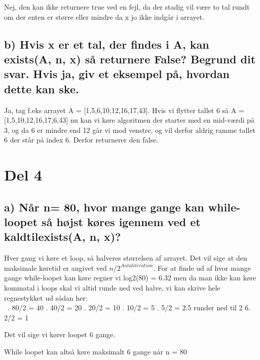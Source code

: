 \documentclass{article}
\begin{document}
Nej, den kan ikke returnere true ved en fejl, da der stadig vil være to tal rundt om der enten er større eller mindre da x jo ikke indgår i arrayet.
\
\subsection*{b) Hvis x er et tal, der findes i A, kan exists(A, n, x) så returnere False? Begrund dit svar. Hvis ja, giv et eksempel på, hvordan dette kan ske.} 

Ja, tag f.eks arrayet A = [1,5,6,10,12,16,17,43]. Hvis vi flytter tallet 6 så A = [1,5,10,12,16,17,6,43] nu kan vi køre algoritmen der starter med en mid-værdi på 3, og da 6 er mindre end 12 går vi mod venstre, og vil derfor aldrig ramme tallet 6 der står på index 6. Derfor returnerer den false.


\section*{Del 4} \subsection*{a) Når n= 80, hvor mange gange kan while-loopet så højst køres igennem ved et kaldtilexists(A, n, x)?} 
Hver gang vi køre et loop, så halveres størrelsen af arrayet. Det vil sige at den maksimale køretid er angivet ved $n/2^{Antal iteration}$. For at finde ud af hvor mange gange while-loopet kan køre regner vi log2(80) = 6.32 men da man ikke kan køre kommatal i loops skal vi altid runde ned ved halve, vi kan skrive hele regnestykket ud sådan her:\\\
\newline
1. 80/2 = 40 . 40/2 = 20 . 20/2 = 10 . 10/2 = 5 . 5/2 = 2.5 \newline
runder ned til 2
6. 2/2 = 1 \newline

Det vil sige vi kører loopet 6 gange. 

While loopet kan altså køre maksimalt 6 gange når n = 80 
\end{document}
